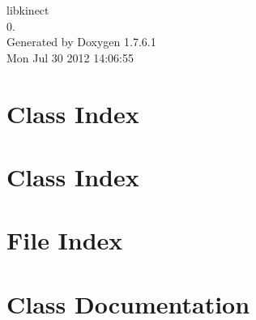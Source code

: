 \documentclass[a4paper]{book}
\begin{document}
\hypersetup{pageanchor=false,citecolor=blue}
\begin{titlepage}
\vspace*{7cm}
\begin{center}
{\Large libkinect \\[1ex]\large 0. }\\
\vspace*{1cm}
{\large \-Generated by Doxygen 1.7.6.1}\\
\vspace*{0.5cm}
{\small Mon Jul 30 2012 14:06:55}\\
\end{center}
\end{titlepage}
\clearemptydoublepage
{}
\tableofcontents
\clearemptydoublepage
{}
\hypersetup{pageanchor=true,citecolor=blue}
\chapter{\-Class \-Index}

\chapter{\-Class \-Index}

\chapter{\-File \-Index}

\chapter{\-Class \-Documentation}
















































\end{document}
